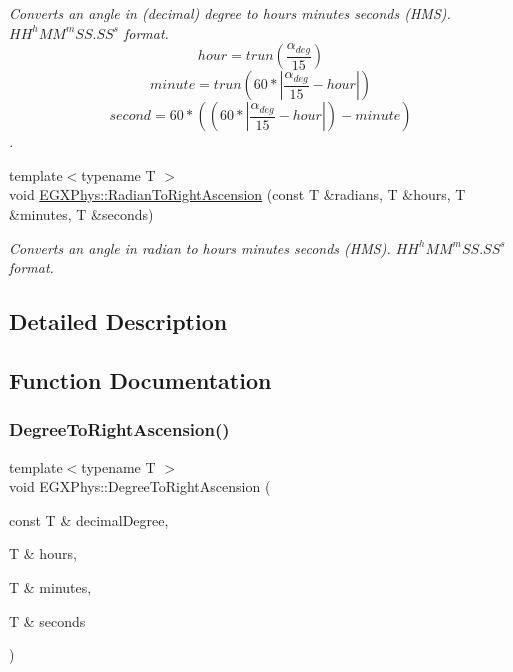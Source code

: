 \begin{DoxyCompactItemize}
\begin{DoxyCompactList}\small\item\em Converts an angle in (decimal) degree to hours minutes seconds (H\+MS). ${HH}^{h}{MM}^{m}{SS.SS}^{s}$ format. \[hour=trun(\frac{\alpha_{deg}}{15})\] \[minute=trun(60 * |\frac{\alpha_{deg}}{15} - hour|)\] \[second=60 * ((60 * |\frac{\alpha_{deg}}{15} - hour|)-minute)\]. \end{DoxyCompactList}\item 
{\footnotesize template$<$typename T $>$ }\\void \mbox{\hyperlink{group___e_g_x_phys-_astrophysics-_right_ascension_ga50c306a7d118d3b3c02bc3621e1cb078}{E\+G\+X\+Phys\+::\+Radian\+To\+Right\+Ascension}} (const T \&radians, T \&hours, T \&minutes, T \&seconds)
\begin{DoxyCompactList}\small\item\em Converts an angle in radian to hours minutes seconds (H\+MS). ${HH}^h{MM}^m{SS.SS}^s$ format. \end{DoxyCompactList}\end{DoxyCompactItemize}


\subsection{Detailed Description}


\subsection{Function Documentation}
\mbox{\label{group___e_g_x_phys-_astrophysics-_right_ascension_gabdd9d1c686dd5e2580518f526b78295f}} 
\subsubsection{\texorpdfstring{Degree\+To\+Right\+Ascension()}{DegreeToRightAscension()}}
{\footnotesize\ttfamily template$<$typename T $>$ \\
void E\+G\+X\+Phys\+::\+Degree\+To\+Right\+Ascension (\begin{DoxyParamCaption}\item[{const T \&}]{decimal\+Degree,  }\item[{T \&}]{hours,  }\item[{T \&}]{minutes,  }\item[{T \&}]{seconds }\end{DoxyParamCaption})}



